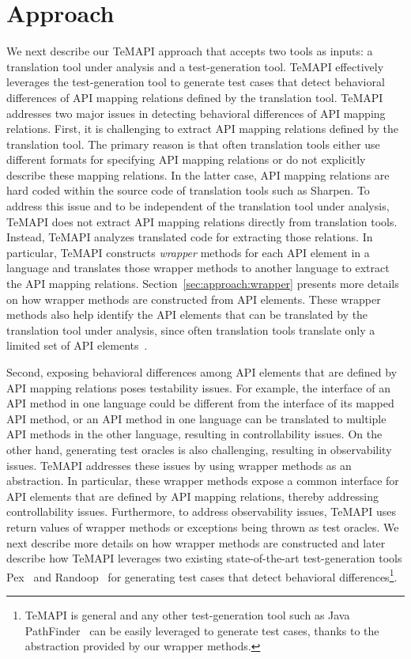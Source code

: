 \section{Approach}
\label{sec:approach}

We next describe our TeMAPI approach that accepts two tools as inputs: a translation tool under analysis and a test-generation tool. TeMAPI effectively leverages the test-generation tool to generate test cases that detect behavioral differences of API mapping relations defined by the translation tool. TeMAPI addresses two major issues in detecting behavioral differences of API mapping relations. First, it is challenging to extract API mapping relations defined by the translation tool. The primary reason is that often translation tools either use different formats for specifying API mapping relations or do not explicitly describe these mapping relations. In the latter case, API mapping relations are hard coded within the source code of translation tools such as Sharpen. To address this issue and to be independent of the translation tool under analysis, TeMAPI does not extract API mapping relations directly from translation tools. Instead, TeMAPI analyzes translated code for extracting those relations. In particular, TeMAPI constructs \emph{wrapper} methods for each API element in a language and translates those wrapper methods to another language to extract the API mapping relations. Section~\ref{sec:approach:wrapper} presents more details on how wrapper methods are constructed from API elements. These wrapper methods also help identify the API elements that can be translated by the translation tool under analysis, since often translation tools translate only a limited set of API elements~\citep{zhong2010mining}.

Second, exposing behavioral differences among API elements that are defined by API mapping relations poses testability issues. For example, the interface of an API method in one language could be different from the interface of its mapped API method, or an API method in one language can be translated to multiple API methods in the other language, resulting in controllability issues. On the other hand, generating test oracles is also challenging, resulting in observability issues. TeMAPI addresses these issues by using wrapper methods as an abstraction. In particular, these wrapper methods expose a common interface for API elements that are defined by API mapping relations, thereby addressing controllability issues. Furthermore, to address observability issues, TeMAPI uses return values of wrapper methods or exceptions being thrown as test oracles. We next describe more details on how wrapper methods are constructed and later describe how TeMAPI leverages two existing state-of-the-art test-generation tools Pex~\citep{tillmann2008pex} and Randoop~\citep{pacheco2007feedback} for generating test cases that detect behavioral differences\footnote{TeMAPI is general and any other test-generation tool such as Java PathFinder~\citep{DBLP:conf/tacas/AnandPV07} can be easily leveraged to generate test cases,  thanks to the abstraction provided by our wrapper methods.}.


